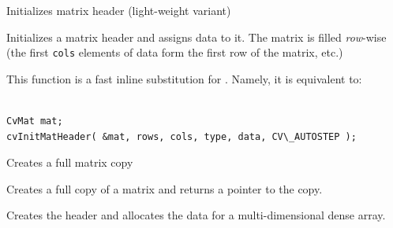 \label{Mat}

Initializes matrix header (light-weight variant)


\begin{description}
\end{description}

Initializes a matrix header and assigns data to it. The matrix is filled \textit{row}-wise (the first \texttt{cols} elements of data form the first row of the matrix, etc.)

This function is a fast inline substitution for . Namely, it is equivalent to:

\begin{lstlisting}

CvMat mat;
cvInitMatHeader( &mat, rows, cols, type, data, CV\_AUTOSTEP );

\end{lstlisting}


\label{CloneMat}

Creates a full matrix copy


\begin{description}
\end{description}

Creates a full copy of a matrix and returns a pointer to the copy.

\label{CreateMatND}

Creates the header and allocates the data for a multi-dimensional dense array.


